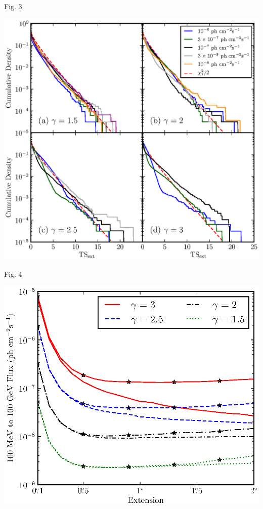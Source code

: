 \documentclass[12pt]{beamer}
\begin{document}
\begin{frame}{Fig. 3}
  \begin{center}
    \includegraphics[scale=0.5]{../paper/mc_plots/ts_ext_emin_1000_color.eps}
  \end{center}
\end{frame}

\begin{frame}{Fig. 4}
  \begin{center}
    \includegraphics[scale=0.5]{../paper/mc_plots/index_sensitivity_color.eps}
  \end{center}
\end{frame}
\end{document}
